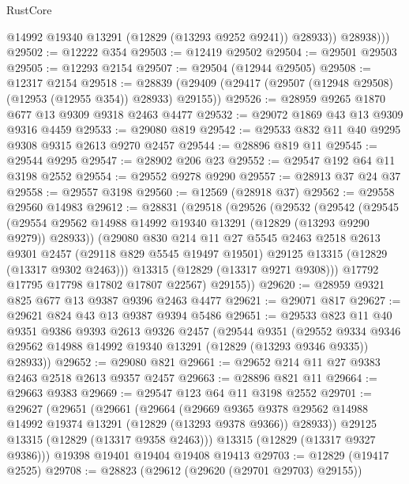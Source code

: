 \begin{lexlean}{RustCore}
\begin{coremodule}
              @14992
              @19340
              @13291
              (@12829 (@13293 @9252 @9241))
              @28933))
          @28938)))
@29502 := @12222 @354
@29503 := @12419 @29502
@29504 := @29501 @29503
@29505 := @12293 @2154
@29507 := @29504 (@12944 @29505)
@29508 := @12317 @2154
@29518 := @28839 (@29409 (@29417 (@29507 (@12948 @29508) (@12953 (@12955 @354)) @28933) @29155))
@29526 := @28959 @9265 @1870 @677 @13 @9309 @9318 @2463 @4477
@29532 := @29072 @1869 @43 @13 @9309 @9316 @4459
@29533 := @29080 @819
@29542 := @29533 @832 @11 @40 @9295 @9308 @9315 @2613 @9270 @2457
@29544 := @28896 @819 @11
@29545 := @29544 @9295
@29547 := @28902 @206 @23
@29552 := @29547 @192 @64 @11 @3198 @2552
@29554 := @29552 @9278 @9290
@29557 := @28913 @37 @24 @37
@29558 := @29557 @3198
@29560 := @12569 (@28918 @37)
@29562 := @29558 @29560 @14983
@29612 := @28831
    (@29518
      (@29526
        (@29532
          (@29542
            (@29545
              (@29554 @29562 @14988 @14992 @19340 @13291 (@12829 (@13293 @9290 @9279)) @28933))
            (@29080
              @830
              @214
              @11
              @27
              @5545
              @2463
              @2518
              @2613
              @9301
              @2457
              (@29118 @829 @5545 @19497 @19501)
              @29125
              @13315
              (@12829 (@13317 @9302 @2463)))
            @13315
            (@12829 (@13317 @9271 @9308)))
          @17792
          @17795
          @17798
          @17802
          @17807
          @22567)
        @29155))
@29620 := @28959 @9321 @825 @677 @13 @9387 @9396 @2463 @4477
@29621 := @29071 @817
@29627 := @29621 @824 @43 @13 @9387 @9394 @5486
@29651 := @29533
    @823
    @11
    @40
    @9351
    @9386
    @9393
    @2613
    @9326
    @2457
    (@29544
      @9351
      (@29552 @9334 @9346 @29562 @14988 @14992 @19340 @13291 (@12829 (@13293 @9346 @9335)) @28933))
@29652 := @29080 @821
@29661 := @29652 @214 @11 @27 @9383 @2463 @2518 @2613 @9357 @2457
@29663 := @28896 @821 @11
@29664 := @29663 @9383
@29669 := @29547 @123 @64 @11 @3198 @2552
@29701 := @29627
    (@29651
      (@29661
        (@29664
          (@29669
            @9365
            @9378
            @29562
            @14988
            @14992
            @19374
            @13291
            (@12829 (@13293 @9378 @9366))
            @28933))
        @29125
        @13315
        (@12829 (@13317 @9358 @2463)))
      @13315
      (@12829 (@13317 @9327 @9386)))
    @19398
    @19401
    @19404
    @19408
    @19413
@29703 := @12829 (@19417 @2525)
@29708 := @28823 (@29612 (@29620 (@29701 @29703) @29155))

\end{coremodule}
\end{lexlean}
